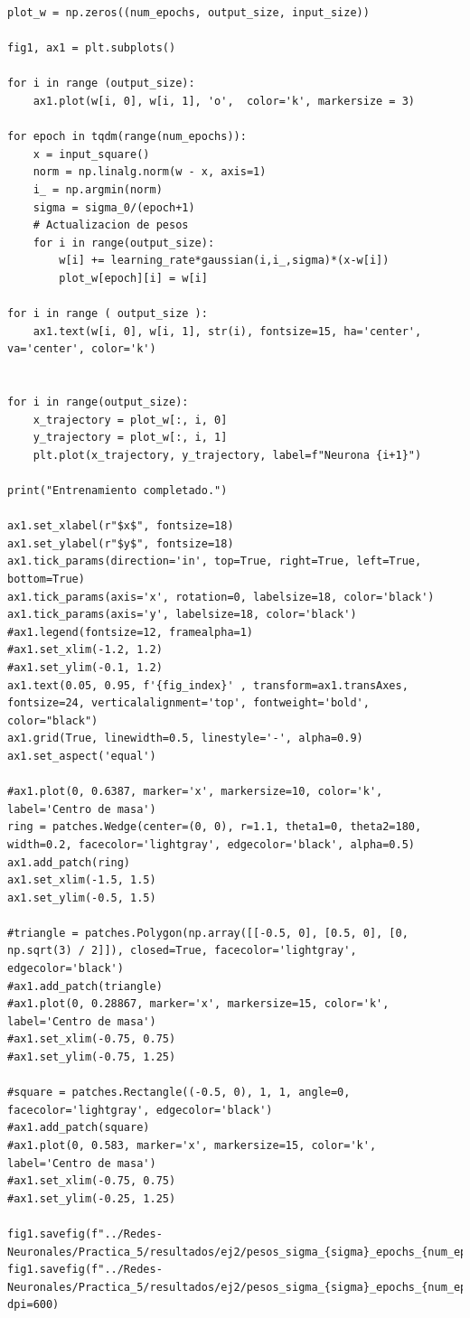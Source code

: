 \documentclass[11pt,twocolumn,twoside]{opticajnl}
\begin{document}
\begin{onecolumn}
\begin{lstlisting}[style=mystyle]
plot_w = np.zeros((num_epochs, output_size, input_size))

fig1, ax1 = plt.subplots()

for i in range (output_size):
    ax1.plot(w[i, 0], w[i, 1], 'o',  color='k', markersize = 3)

for epoch in tqdm(range(num_epochs)):
    x = input_square()
    norm = np.linalg.norm(w - x, axis=1)
    i_ = np.argmin(norm)
    sigma = sigma_0/(epoch+1)
    # Actualizacion de pesos
    for i in range(output_size):
        w[i] += learning_rate*gaussian(i,i_,sigma)*(x-w[i])
        plot_w[epoch][i] = w[i]

for i in range ( output_size ):
    ax1.text(w[i, 0], w[i, 1], str(i), fontsize=15, ha='center', va='center', color='k')


for i in range(output_size):
    x_trajectory = plot_w[:, i, 0]
    y_trajectory = plot_w[:, i, 1]
    plt.plot(x_trajectory, y_trajectory, label=f"Neurona {i+1}")

print("Entrenamiento completado.")

ax1.set_xlabel(r"$x$", fontsize=18)
ax1.set_ylabel(r"$y$", fontsize=18)
ax1.tick_params(direction='in', top=True, right=True, left=True, bottom=True)
ax1.tick_params(axis='x', rotation=0, labelsize=18, color='black')
ax1.tick_params(axis='y', labelsize=18, color='black')
#ax1.legend(fontsize=12, framealpha=1)
#ax1.set_xlim(-1.2, 1.2)
#ax1.set_ylim(-0.1, 1.2)
ax1.text(0.05, 0.95, f'{fig_index}' , transform=ax1.transAxes, fontsize=24, verticalalignment='top', fontweight='bold', color="black")
ax1.grid(True, linewidth=0.5, linestyle='-', alpha=0.9)
ax1.set_aspect('equal')

#ax1.plot(0, 0.6387, marker='x', markersize=10, color='k', label='Centro de masa')
ring = patches.Wedge(center=(0, 0), r=1.1, theta1=0, theta2=180, width=0.2, facecolor='lightgray', edgecolor='black', alpha=0.5)
ax1.add_patch(ring)
ax1.set_xlim(-1.5, 1.5)
ax1.set_ylim(-0.5, 1.5)

#triangle = patches.Polygon(np.array([[-0.5, 0], [0.5, 0], [0, np.sqrt(3) / 2]]), closed=True, facecolor='lightgray', edgecolor='black')
#ax1.add_patch(triangle)
#ax1.plot(0, 0.28867, marker='x', markersize=15, color='k', label='Centro de masa')
#ax1.set_xlim(-0.75, 0.75)
#ax1.set_ylim(-0.75, 1.25)

#square = patches.Rectangle((-0.5, 0), 1, 1, angle=0, facecolor='lightgray', edgecolor='black')
#ax1.add_patch(square)
#ax1.plot(0, 0.583, marker='x', markersize=15, color='k', label='Centro de masa')
#ax1.set_xlim(-0.75, 0.75)
#ax1.set_ylim(-0.25, 1.25)

fig1.savefig(f"../Redes-Neuronales/Practica_5/resultados/ej2/pesos_sigma_{sigma}_epochs_{num_epochs}_lr_{learning_rate}.pdf")
fig1.savefig(f"../Redes-Neuronales/Practica_5/resultados/ej2/pesos_sigma_{sigma}_epochs_{num_epochs}_lr_{learning_rate}.png", dpi=600)

\end{lstlisting}

\end{onecolumn}
\end{document}
